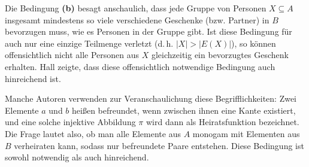 \begin{math-stroke}

\begin{explanation-of-steps}
Die Bedingung \textbf{(b)} besagt anschaulich, dass jede Gruppe von Personen $X \subseteq A$ insgesamt mindestens so viele verschiedene Geschenke (bzw. Partner) in $B$ bevorzugen muss, wie es Personen in der Gruppe gibt. Ist diese Bedingung für auch nur eine einzige Teilmenge verletzt (d.\,h. $|X| > |E(X)|$), so können offensichtlich nicht alle Personen aus $X$ gleichzeitig ein bevorzugtes Geschenk erhalten. Hall zeigte, dass diese offensichtlich notwendige Bedingung auch hinreichend ist.
\end{explanation-of-steps}
\end{math-stroke}

\begin{spoken-clean}[01:11:00 - 01:12:30]
Manche Autoren verwenden zur Veranschaulichung diese Begrifflichkeiten: Zwei Elemente $a$ und $b$ heißen befreundet, wenn zwischen ihnen eine Kante existiert, und eine solche injektive Abbildung $\pi$ wird dann als Heiratsfunktion bezeichnet. Die Frage lautet also, ob man alle Elemente aus $A$ monogam mit Elementen aus $B$ verheiraten kann, sodass nur befreundete Paare entstehen. Diese Bedingung ist sowohl notwendig als auch hinreichend.
\end{spoken-clean}

\begin{math-stroke}
\end{math-stroke}

